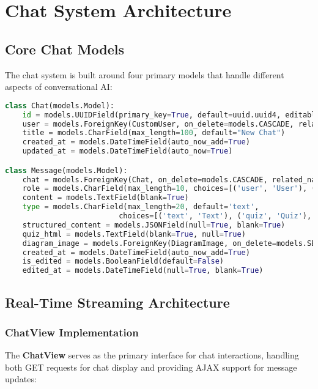 \documentclass[12pt,a4paper]{article}
\begin{document}
\section{Chat System Architecture}

\subsection{Core Chat Models}

The chat system is built around four primary models that handle different aspects of conversational AI:

\begin{lstlisting}[language=Python, caption=Chat System Models]
class Chat(models.Model):
    id = models.UUIDField(primary_key=True, default=uuid.uuid4, editable=False)
    user = models.ForeignKey(CustomUser, on_delete=models.CASCADE, related_name='chats')
    title = models.CharField(max_length=100, default="New Chat")
    created_at = models.DateTimeField(auto_now_add=True)
    updated_at = models.DateTimeField(auto_now=True)

class Message(models.Model):
    chat = models.ForeignKey(Chat, on_delete=models.CASCADE, related_name='messages')
    role = models.CharField(max_length=10, choices=[('user', 'User'), ('assistant', 'Assistant')])
    content = models.TextField(blank=True)
    type = models.CharField(max_length=20, default='text', 
                          choices=[('text', 'Text'), ('quiz', 'Quiz'), ('diagram', 'Diagram'), ('youtube', 'YouTube')])
    structured_content = models.JSONField(null=True, blank=True)
    quiz_html = models.TextField(blank=True, null=True)
    diagram_image = models.ForeignKey(DiagramImage, on_delete=models.SET_NULL, null=True, blank=True)
    created_at = models.DateTimeField(auto_now_add=True)
    is_edited = models.BooleanField(default=False)
    edited_at = models.DateTimeField(null=True, blank=True)
\end{lstlisting}

\subsection{Real-Time Streaming Architecture}

\subsubsection{ChatView Implementation}

The \textbf{ChatView} serves as the primary interface for chat interactions, handling both GET requests for chat display and providing AJAX support for message updates:
\end{document}
